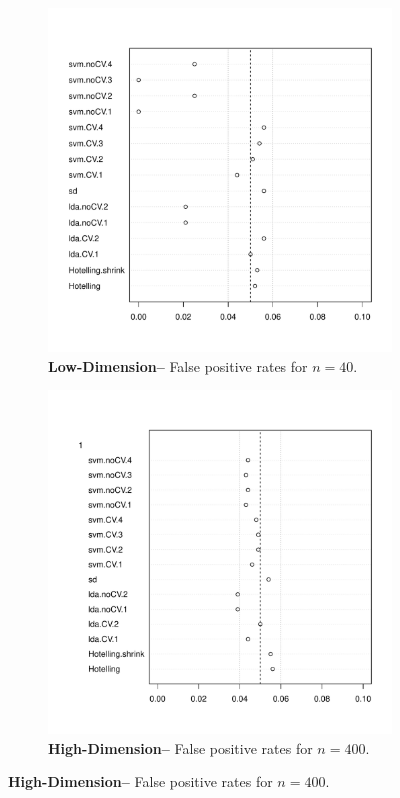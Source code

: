 \documentclass[12pt,a4paper]{article}
\begin{document}
\begin{figure}[h]
\centering
\caption{\mycaption}	
\label{fig:large_sample}
	\begin{subfigure}{.5\textwidth}
	  \centering
	  \includegraphics[width=1\linewidth]{"art/2016-07-27 11:42:05zoom"}
	  \caption{\textbf{Low-Dimension--} False positive rates for $n=40$.} 
	\label{fig:large_sample_1}
	\end{subfigure}%
	\begin{subfigure}{.5\textwidth}
	  \centering
	  \includegraphics[width=1\linewidth]{"art/2016-08-04 13:59:33zoom"}
	  \caption{\textbf{High-Dimension--} False positive rates for $n=400$.} 
	\label{fig:large_sample_2}
	\end{subfigure}
\end{figure}
\end{document}

